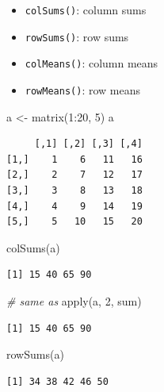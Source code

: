 \documentclass[
]{book}
\newenvironment{Shaded}{\begin{snugshade}}{\end{snugshade}}
\newcommand{\CommentTok}[1]{\textcolor[rgb]{0.56,0.35,0.01}{\textit{#1}}}
\newcommand{\DecValTok}[1]{\textcolor[rgb]{0.00,0.00,0.81}{#1}}
\newcommand{\FunctionTok}[1]{\textcolor[rgb]{0.00,0.00,0.00}{#1}}
\newcommand{\NormalTok}[1]{#1}
\newcommand{\OtherTok}[1]{\textcolor[rgb]{0.56,0.35,0.01}{#1}}
\newcommand{\SpecialCharTok}[1]{\textcolor[rgb]{0.00,0.00,0.00}{#1}}
\providecommand{\tightlist}{%
  \setlength{\itemsep}{0pt}\setlength{\parskip}{0pt}}
\begin{document}
\begin{itemize}
\tightlist
\item
  \texttt{colSums()}: column sums
\item
  \texttt{rowSums()}: row sums
\item
  \texttt{colMeans()}: column means
\item
  \texttt{rowMeans()}: row means
\end{itemize}

\begin{Shaded}
\begin{Highlighting}[]
\NormalTok{a }\OtherTok{\textless{}{-}} \FunctionTok{matrix}\NormalTok{(}\DecValTok{1}\SpecialCharTok{:}\DecValTok{20}\NormalTok{, }\DecValTok{5}\NormalTok{)}
\NormalTok{a}
\end{Highlighting}
\end{Shaded}

\begin{verbatim}
     [,1] [,2] [,3] [,4]
[1,]    1    6   11   16
[2,]    2    7   12   17
[3,]    3    8   13   18
[4,]    4    9   14   19
[5,]    5   10   15   20
\end{verbatim}

\begin{Shaded}
\begin{Highlighting}[]
\FunctionTok{colSums}\NormalTok{(a)}
\end{Highlighting}
\end{Shaded}

\begin{verbatim}
[1] 15 40 65 90
\end{verbatim}

\begin{Shaded}
\begin{Highlighting}[]
\CommentTok{\# same as}
\FunctionTok{apply}\NormalTok{(a, }\DecValTok{2}\NormalTok{, sum)}
\end{Highlighting}
\end{Shaded}

\begin{verbatim}
[1] 15 40 65 90
\end{verbatim}

\begin{Shaded}
\begin{Highlighting}[]
\FunctionTok{rowSums}\NormalTok{(a)}
\end{Highlighting}
\end{Shaded}

\begin{verbatim}
[1] 34 38 42 46 50
\end{verbatim}
\end{document}
